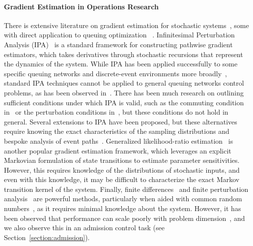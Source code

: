 \paragraph{Gradient Estimation in Operations Research}
There is extensive literature on gradient estimation for stochastic systems~\cite{glasserman1990gradient, glasserman1992derivative, glynn1987likelilood, cao1985convergence, fu2012conditional}, some with direct application to queuing optimization ~\cite{l1994stochastic, glynn1990likelihood, fu2012conditional}.
Infinitesimal Perturbation Analysis (IPA)~\cite{glasserman1990gradient, ho1983infinitesimal, johnson1989infinitesimal} is a standard framework for constructing pathwise gradient estimators, which takes derivatives through stochastic recursions that represent the dynamics of the system. While IPA has been applied successfully to some specific queuing networks and discrete-event environments more broadly~\cite{suri1987infinitesimal}, standard IPA techniques cannot be applied to general queuing networks control problems, as has been observed in~\cite{cao1987first}. There has been much research on outlining sufficient conditions under which IPA is valid, such as the commuting condition in~\cite{glasserman1990gradient, glasserman1992derivative} or the perturbation conditions in~\cite{cao1985convergence}, but these conditions do not hold in general. Several extensions to IPA have been proposed, but these alternatives require knowing the exact characteristics of the sampling distributions and bespoke analysis of event paths~\cite{fu2012conditional, fu1994smoothed}. Generalized likelihood-ratio estimation~\cite{glynn1987likelilood} is another popular gradient estimation framework, which leverages an explicit Markovian formulation of state transitions to estimate parameter sensitivities. However, this requires knowledge of the distributions of stochastic inputs, and even with this knowledge, it may be difficult to characterize the exact Markov transition kernel of the system. Finally, finite differences~\cite{fu1997optimization} and finite perturbation analysis~\cite{ho1983infinitesimal, cao1987first} are powerful methods, particularly when aided with common random numbers~\cite{glynn1989optimization, glasserman1992some}, as it requires minimal knowledge about the system. However, it has been observed that performance can scale poorly with problem dimension~\cite{glasserman2004monte, glynn1989optimization}, and we also observe this in an admission control task (see Section~\ref{section:admission}).

